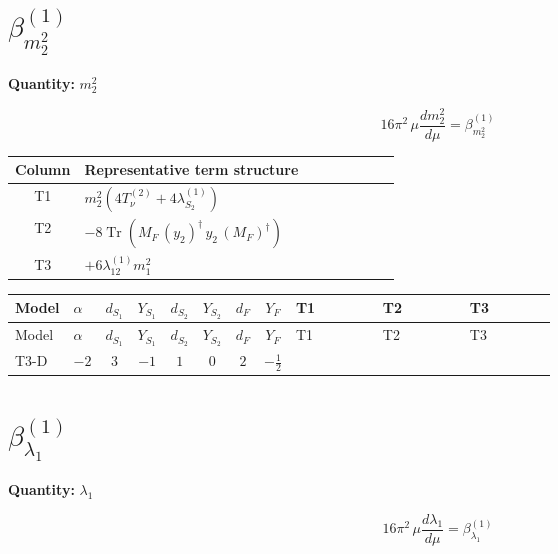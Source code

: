 \documentclass[8pt]{article}
\begin{document}
\begin{landscape}
\section*{$\beta_{m_2^2}^{(1)}$}
\noindent\textbf{Quantity: }$m_2^2$\par\smallskip
\[16\pi^2\,\mu\frac{d m_2^2}{d\mu}=\beta_{m_2^2}^{(1)}\]
\begin{center}
\begin{tabular}{@{}c >{\raggedright\arraybackslash}p{0.82\linewidth}@{}}
\toprule
Column & Representative term structure \\
\midrule
T1 & \(\displaystyle {m_2^2} (4 T_{\nu}^{(2)}+4 {\lambda_{S_2}^{(1)}})\) \\
\midrule
T2 & \(\displaystyle -8 \operatorname{Tr}\!\left({M_F}\,\left({y_2}\right)^{\dagger}\,{y_2}\,\left({M_F}\right)^{\dagger}\right)\) \\
\midrule
T3 & \(\displaystyle +6 {\lambda_{12}^{(1)}} {m_1^2}\) \\
\midrule
\bottomrule
\end{tabular}
\end{center}
\smallskip
\tiny
\begin{longtable}{@{}llcccccc >{\raggedright\arraybackslash}p{0.21\linewidth} >{\raggedright\arraybackslash}p{0.21\linewidth} >{\raggedright\arraybackslash}p{0.21\linewidth}@{}}
\toprule
Model & $\alpha$ & $d_{S_1}$ & $Y_{S_1}$ & $d_{S_2}$ & $Y_{S_2}$ & $d_F$ & $Y_F$ & T1 & T2 & T3 \\
\midrule
\endfirsthead
\toprule
Model & $\alpha$ & $d_{S_1}$ & $Y_{S_1}$ & $d_{S_2}$ & $Y_{S_2}$ & $d_F$ & $Y_F$ & T1 & T2 & T3 \\
\midrule
\endhead
T3-D & $-2$ & $3$ & $-1$ & $1$ & $0$ & $2$ & $-\frac{1}{2}$ & \scriptsize\adjustbox{max width=\linewidth}{$\begin{gathered} {m_2^2} (4 T_{\nu}^{(2)}+4 {\lambda_{S_2}^{(1)}})\end{gathered}$} & \scriptsize\adjustbox{max width=\linewidth}{$\begin{gathered} -8 \operatorname{Tr}\!\left({M_F}\,\left({y_2}\right)^{\dagger}\,{y_2}\,\left({M_F}\right)^{\dagger}\right)\end{gathered}$} & \scriptsize\adjustbox{max width=\linewidth}{$\begin{gathered} +6 {\lambda_{12}^{(1)}} {m_1^2}\end{gathered}$} \\
\midrule
\bottomrule
\end{longtable}
\clearpage
\section*{$\beta_{\lambda_1}^{(1)}$}
\noindent\textbf{Quantity: }$\lambda_1$\par\smallskip
\[16\pi^2\,\mu\frac{d \lambda_1}{d\mu}=\beta_{\lambda_1}^{(1)}\]

\end{landscape}
\end{document}
